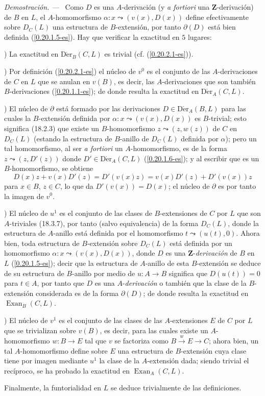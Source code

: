 \documentclass[10pt,oneside]{book}
\newcommand{\sref}[1]{\textup{(\ref{#1})}}
\newenvironment{proof}{%
  \par\medskip\noindent\textit{Demostración. ---\ }}{\par}
\begin{document}
\begin{proof}
Como $D$ es una $A$-derivación (y \emph{a fortiori} una
$\mathbf{Z}$-derivación) de $B$ en $L$, el $A$-homomorfismo
$\alpha:x\leadsto(v(x),D(x))$ define efectivamente sobre $D_C(L)$ una estructura de
$B$-extensión, por tanto $\partial(D)$ está bien definida \sref{0.20.1.5-es}. Hay
que verificar la exactitud en $5$ lugares:

\medskip
{})\enspace
La exactitud en $\operatorname{D\acute{e}r}_B(C,L)$ es trivial (cf.
\sref{0.20.2.1-es}).

\medskip
{})\enspace
Por definición \sref{0.20.2.1-es} el núcleo de $v^0$ es el conjunto de las
$A$-derivaciones de $C$ en $L$ que se anulan en $v(B)$, es decir,
las $A$-derivaciones que son también $B$-derivaciones
\sref{0.20.1.1-es}; de donde resulta la exactitud en $\operatorname{D\acute{e}r}_A(C,L)$.

\medskip
{})\enspace
El núcleo de $\partial$ está formado por las derivaciones
$D\in\operatorname{D\acute{e}r}_A(B,L)$ para las cuales la $B$-extensión definida por
$\alpha:x\leadsto(v(x),D(x))$ es $B$-trivial; esto significa (18.2.3) que
existe un $B$-homomorfismo $z\leadsto(z,w(z))$ de $C$ en $D_C(L)$ (estando la
estructura de $B$-anillo de $D_C(L)$ definida por $\alpha$); pero un tal
homomorfismo, al ser \emph{a fortiori} un $A$-homomorfismo, es de la forma
$z\leadsto(z,D'(z))$ donde $D'\in\operatorname{D\acute{e}r}_A(C,L)$
\sref{0.20.1.6-es}; y al escribir que es un $B$-homomorfismo, se obtiene
\[
  D(x)z+v(x)D'(z)=D'(v(x)z)=v(x)D'(z)+D'(v(x))z
\]
para $x\in B$, $z\in C$, lo que da $D'(v(x))=D(x)$; el núcleo de
$\partial$ es por tanto la imagen de $v^0$.

\medskip
{})\enspace
El núcleo de $u^1$ es el conjunto de las clases de $B$-extensiones de $C$ por
$L$ que son $A$-triviales (18.3.7), por tanto (salvo equivalencia) de la forma
$D_C(L)$, donde la estructura de $A$-anillo está definida por el homomorfismo
$t\leadsto(u(t),0)$. Ahora bien, toda estructura de $B$-extensión sobre $D_C(L)$ está
definida por un homomorfismo $\alpha:x\leadsto(v(x),D(x))$, donde $D$ es una
$\mathbf{Z}$-\emph{derivación} de $B$ en $L$ \sref{0.20.1.5-es}; decir que la
estructura de $A$-anillo de esta $B$-extensión se deduce de su estructura de
$B$-anillo por medio de $u:A\to B$ significa que $D(u(t))=0$ para $t\in A$,
por tanto que $D$ es una $A$-\emph{derivación} o también que la clase de la $B$-extensión
considerada es de la forma $\partial(D)$; de donde resulta la exactitud en
$\operatorname{Exan}_B(C,L)$.

\medskip
{})\enspace
El núcleo de $v^1$ es el conjunto de las clases de las $A$-extensiones $E$ de $C$
por $L$ que se trivializan sobre $v(B)$, es decir, para las cuales existe un
$A$-homomorfismo $w:B\to E$ tal que $v$ se factoriza como
$B\xrightarrow{w}E\to C$; ahora bien, un tal $A$-homomorfismo define sobre $E$ una
estructura de $B$-extensión cuya clase tiene por imagen mediante $u^1$ la clase de
la $A$-extensión dada; siendo trivial el recíproco, se ha probado
la exactitud en $\operatorname{Exan}_A(C,L)$.

Finalmente, la funtorialidad en $L$ se deduce trivialmente de las definiciones.
\end{proof}
\end{document}
